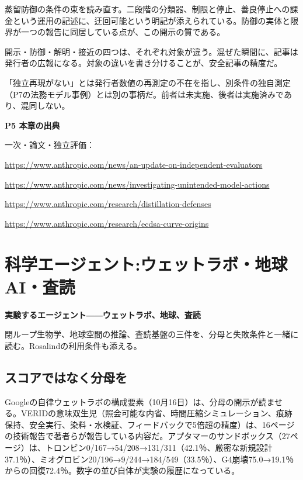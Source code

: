 \documentclass[lualatex,a4paper,10pt]{jlreq}
\begin{document}
蒸留防御の条件の束を読み直す。二段階の分類器、制限と停止、善良停止への課金という運用の記述に、迂回可能という明記が添えられている。防御の実体と限界が一つの報告に同居している点が、この開示の質である。
\cite{B41}


開示・防御・解明・接近の四つは、それぞれ対象が違う。混ぜた瞬間に、記事は発行者の広報になる。対象の違いを書き分けることが、安全記事の精度だ。
\cite{B39,B40,B41,B42}


「独立再現がない」とは発行者数値の再測定の不在を指し、別条件の独自測定（P7の法務モデル事例）とは別の事柄だ。前者は未実施、後者は実施済みであり、混同しない。

\begin{tcolorbox}[colback=white,colframe=SurveyRule,arc=1mm,boxrule=0.4pt,left=2mm,right=2mm]
\textbf{P5 本章の出典}\par\footnotesize
一次・論文・独立評価：\par
[B39] \url{https://www.anthropic.com/news/an-update-on-independent-evaluators}\par
[B40] \url{https://www.anthropic.com/news/investigating-unintended-model-actions}\par
[B41] \url{https://www.anthropic.com/research/distillation-defenses}\par
[B42] \url{https://www.anthropic.com/research/ecdsa-curve-origins}\par
\end{tcolorbox}

\section{科学エージェント:ウェットラボ・地球AI・査読}
\label{sec:P6}

{\Large\bfseries 実験するエージェント――ウェットラボ、地球、査読\par}
\smallskip
{\color{SurveyMuted}閉ループ生物学、地球空間の推論、査読基盤の三件を、分母と失敗条件と一緒に読む。Rosalindの利用条件も添える。\par}
\bigskip

\subsection*{スコアではなく分母を}

Googleの自律ウェットラボの構成要素（10月16日）は、分母の開示が読ませる。VERIDの意味双生児（照会可能な内省、時間圧縮シミュレーション、痕跡保持、安全実行、染料・水検証、フィードバックで5倍超の精度）は、16ページの技術報告で著者らが報告している内容だ。アプタマーのサンドボックス（27ページ）は、トロンビン0/167→54/208→131/311（42.1％、厳密な新規設計37.1％）、ミオグロビン20/196→9/244→184/549（33.5％）、G4崩壊75.0→19.1％からの回復72.4％。数字の並び自体が実験の履歴になっている。
\cite{B43,B44,B45,B46}
\end{document}
